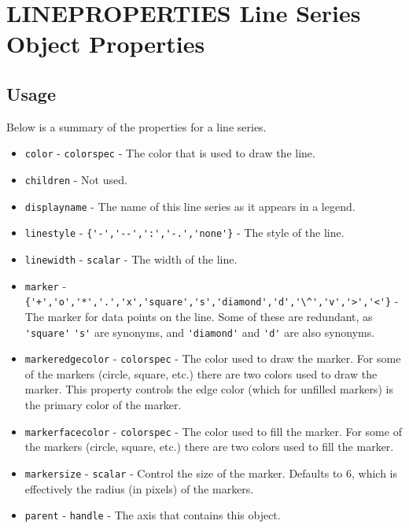 \section{LINEPROPERTIES Line Series Object Properties}

\subsection{Usage}

Below is a summary of the properties for a line series.
\begin{itemize}
\item  \verb|color| - \verb|colorspec| - The color that is used to 
 draw the line.

\item  \verb|children| - Not used.

\item  \verb|displayname| - The name of this line series as it
 appears in a legend.

\item  \verb|linestyle| - \verb|{'-','--',':','-.','none'}| - The style of the line.

\item  \verb|linewidth| - \verb|scalar| - The width of the line.

\item  \verb|marker| - \verb|{'+','o','*','.','x','square','s','diamond','d','\^','v','>','<'}| - 
 The marker for data points on the line.  Some of these are redundant, as \verb|'square'| 
 \verb|'s'| are synonyms, and \verb|'diamond'| and \verb|'d'| are also synonyms.

\item  \verb|markeredgecolor| - \verb|colorspec| - The color used to draw the marker.  For some
 of the markers (circle, square, etc.) there are two colors used to draw the marker.
 This property controls the edge color (which for unfilled markers) is the primary
 color of the marker.

\item  \verb|markerfacecolor| - \verb|colorspec| - The color used to fill the marker.  For some
 of the markers (circle, square, etc.) there are two colors used to fill the marker.

\item  \verb|markersize| - \verb|scalar| - Control the size of the marker.  Defaults to 6, which
 is effectively the radius (in pixels) of the markers.

\item  \verb|parent| - \verb|handle| - The axis that contains this object.


\end{itemize}
